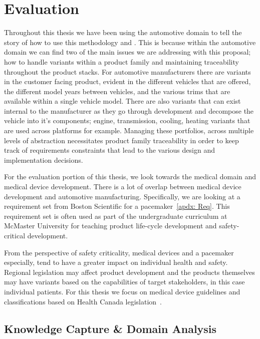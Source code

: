 \chapter{Evaluation}

Throughout this thesis we have been using the automotive domain to tell the story of how to use this methodology and \tool. This is because within the automotive domain we can find two of the main issues we are addressing with this proposal; how to handle variants within a product family and maintaining traceability throughout the product stacks. For automotive manufacturers there are variants in the customer facing product, evident in the different vehicles that are offered, the different model years between vehicles, and the various trims that are available within a single vehicle model. There are also variants that can exist internal to the manufacturer as they go through development and decompose the vehicle into it's components; engine, transmission, cooling, heating variants that are used across platforms for example. Managing these portfolios, across multiple levels of abstraction necessitates product family traceability in order to keep track of requirements constraints that lead to the various design and implementation decisions. 

For the evaluation portion of this thesis, we look towards the medical domain and medical device development. There is a lot of overlap between medical device development and automotive manufacturing. Specifically, we are looking at a requirement set from Boston Scientific for a pacemaker~\ref{apdx: Req}. This requirement set is often used as part of the undergraduate curriculum at McMaster University for teaching product life-cycle development and safety-critical development.

From the perspective of safety criticality, medical devices and a pacemaker especially, tend to have a greater impact on individual health and safety. Regional legislation may affect product development and the products themselves may have variants based on the capabilities of target stakeholders, in this case individual patients. For this thesis we focus on medical device guidelines and classifications based on Health Canada legislation~\cite{CanadaGuidanceDocument}. 

\section{Knowledge Capture \& Domain Analysis}


